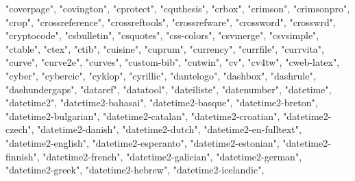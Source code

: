 \documentclass[
]{article}
\newenvironment{Shaded}{\begin{snugshade}}{\end{snugshade}}
\newcommand{\NormalTok}[1]{#1}
\newcommand{\StringTok}[1]{\textcolor[rgb]{0.31,0.60,0.02}{#1}}
\begin{document}
\begin{Shaded}
\begin{Highlighting}[]
\StringTok{"coverpage"}\NormalTok{, }\StringTok{"covington"}\NormalTok{, }\StringTok{"cprotect"}\NormalTok{, }\StringTok{"cquthesis"}\NormalTok{, }\StringTok{"crbox"}\NormalTok{, }\StringTok{"crimson"}\NormalTok{, }
\StringTok{"crimsonpro"}\NormalTok{, }\StringTok{"crop"}\NormalTok{, }\StringTok{"crossreference"}\NormalTok{, }\StringTok{"crossreftools"}\NormalTok{, }\StringTok{"crossrefware"}\NormalTok{, }
\StringTok{"crossword"}\NormalTok{, }\StringTok{"crosswrd"}\NormalTok{, }\StringTok{"cryptocode"}\NormalTok{, }\StringTok{"csbulletin"}\NormalTok{, }\StringTok{"csquotes"}\NormalTok{, }
\StringTok{"css{-}colors"}\NormalTok{, }\StringTok{"csvmerge"}\NormalTok{, }\StringTok{"csvsimple"}\NormalTok{, }\StringTok{"ctable"}\NormalTok{, }\StringTok{"ctex"}\NormalTok{, }\StringTok{"ctib"}\NormalTok{, }
\StringTok{"cuisine"}\NormalTok{, }\StringTok{"cuprum"}\NormalTok{, }\StringTok{"currency"}\NormalTok{, }\StringTok{"currfile"}\NormalTok{, }\StringTok{"currvita"}\NormalTok{, }\StringTok{"curve"}\NormalTok{, }
\StringTok{"curve2e"}\NormalTok{, }\StringTok{"curves"}\NormalTok{, }\StringTok{"custom{-}bib"}\NormalTok{, }\StringTok{"cutwin"}\NormalTok{, }\StringTok{"cv"}\NormalTok{, }\StringTok{"cv4tw"}\NormalTok{, }\StringTok{"cweb{-}latex"}\NormalTok{, }
\StringTok{"cyber"}\NormalTok{, }\StringTok{"cybercic"}\NormalTok{, }\StringTok{"cyklop"}\NormalTok{, }\StringTok{"cyrillic"}\NormalTok{, }\StringTok{"dantelogo"}\NormalTok{, }\StringTok{"dashbox"}\NormalTok{, }
\StringTok{"dashrule"}\NormalTok{, }\StringTok{"dashundergaps"}\NormalTok{, }\StringTok{"dataref"}\NormalTok{, }\StringTok{"datatool"}\NormalTok{, }\StringTok{"dateiliste"}\NormalTok{, }
\StringTok{"datenumber"}\NormalTok{, }\StringTok{"datetime"}\NormalTok{, }\StringTok{"datetime2"}\NormalTok{, }\StringTok{"datetime2{-}bahasai"}\NormalTok{, }\StringTok{"datetime2{-}basque"}\NormalTok{, }
\StringTok{"datetime2{-}breton"}\NormalTok{, }\StringTok{"datetime2{-}bulgarian"}\NormalTok{, }\StringTok{"datetime2{-}catalan"}\NormalTok{, }
\StringTok{"datetime2{-}croatian"}\NormalTok{, }\StringTok{"datetime2{-}czech"}\NormalTok{, }\StringTok{"datetime2{-}danish"}\NormalTok{, }
\StringTok{"datetime2{-}dutch"}\NormalTok{, }\StringTok{"datetime2{-}en{-}fulltext"}\NormalTok{, }\StringTok{"datetime2{-}english"}\NormalTok{, }
\StringTok{"datetime2{-}esperanto"}\NormalTok{, }\StringTok{"datetime2{-}estonian"}\NormalTok{, }\StringTok{"datetime2{-}finnish"}\NormalTok{, }
\StringTok{"datetime2{-}french"}\NormalTok{, }\StringTok{"datetime2{-}galician"}\NormalTok{, }\StringTok{"datetime2{-}german"}\NormalTok{, }
\StringTok{"datetime2{-}greek"}\NormalTok{, }\StringTok{"datetime2{-}hebrew"}\NormalTok{, }\StringTok{"datetime2{-}icelandic"}\NormalTok{, }

\end{Highlighting}
\end{Shaded}
\end{document}
